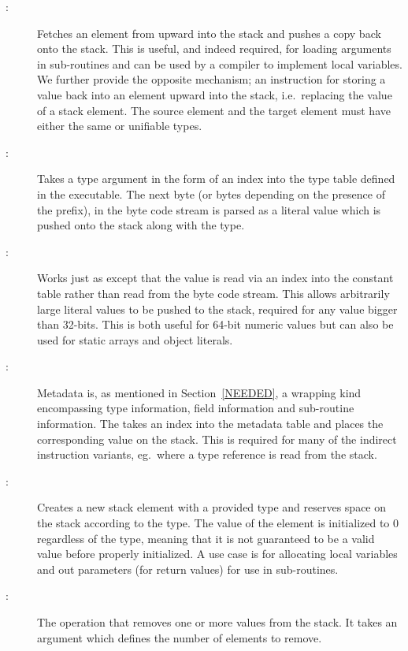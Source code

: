 \begin{description}

\item[:]

  Fetches an element from upward into the stack and pushes a copy back onto the
  stack. This is useful, and indeed required, for loading arguments in
  sub-routines and can be used by a compiler to implement local variables. We
  further provide the opposite mechanism; an instruction for storing a value
  back into an element upward into the stack, i.e.~replacing the value of a
  stack element. The source element and the target element must have either the
  same or unifiable types.

\item[:]

  Takes a type argument in the form of an index into the type table defined in
  the executable. The next byte (or bytes depending on the presence of the
   prefix), in the byte code stream is parsed as a literal value
  which is pushed onto the stack along with the type.

\item[:]

  Works just as  except that the value is read via an index
  into the constant table rather than read from the byte code stream. This
  allows arbitrarily large literal values to be pushed to the stack, required
  for any value bigger than 32-bits. This is both useful for 64-bit numeric
  values but can also be used for static arrays and object literals.

\item[:]

  Metadata is, as mentioned in Section~\ref{NEEDED}, a wrapping kind
  encompassing type information, field information and sub-routine
  information. The  takes an index into the metadata table and
  places the corresponding value on the stack. This is required for many of the
  indirect instruction variants, eg.~where a type reference is read from the
  stack.

\item[:]

  Creates a new stack element with a provided type and reserves space on the
  stack according to the type. The value of the element is initialized to 0
  regardless of the type, meaning that it is not guaranteed to be a valid value
  before properly initialized. A use case is for allocating local variables and
  out parameters (for return values) for use in sub-routines.

\item[:]

  The operation that removes one or more values from the stack. It takes an
  argument which defines the number of elements to remove.

\end{description}

